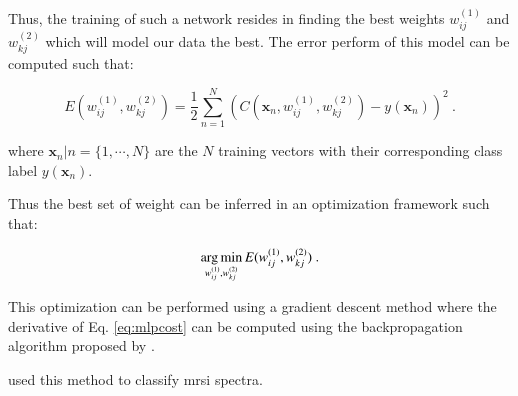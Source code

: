 \begin{enumerate}[leftmargin=*]
Thus, the training of such a network resides in finding the best weights $w_{ij}^{(1)}$ and $ w_{kj}^{(2)}$ which will model our data the best. The error perform of this model can be computed such that:

\begin{equation}
	E(w_{ij}^{(1)},w_{kj}^{(2)}) = \frac{1}{2} \sum_{n=1}^{N} \left( C(\mathbf{x}_n,w_{ij}^{(1)},w_{kj}^{(2)}) - y(\mathbf{x}_n) \right) ^{2} \ .
	\label{eq:mlpcost}
\end{equation}

\noindent where $\mathbf{x}_n|n=\{1,\cdots,N\}$ are the $N$ training vectors with their corresponding class label $y(\mathbf{x}_n)$.

Thus the best set of weight can be inferred in an optimization framework such that:

\begin{equation}
	\operatorname*{arg\,min}_{w_{ij}^{(1)},w_{kj}^{(2)}} E(w_{ij}^{(1)},w_{kj}^{(2)}) \ . 
	\label{eq:mlpopt}
\end{equation}

This optimization can be performed using a gradient descent method where the derivative of Eq. \ref{eq:mlpcost} can be computed using the backpropagation algorithm proposed by \cite{Rumelhart1988}.

\cite{Matulewicz2013,Parfait2012} used this method to classify \ac{mrsi} spectra.

\begin{figure}
\centering
\def\layersep{3cm}
\def\finallayersep{2.2cm}
\end{figure}
\end{enumerate}
